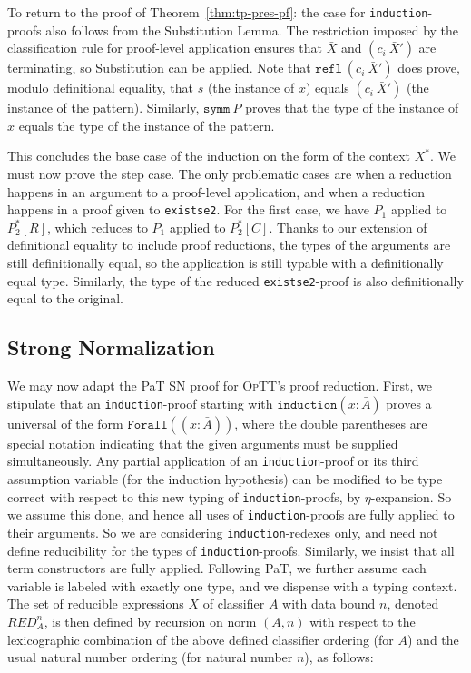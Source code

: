 \documentclass{fundam}
\newcommand{\optt}{\textsc{OpTT}}
\begin{document}
To return to the proof of Theorem~\ref{thm:tp-pres-pf}: the case for
\texttt{induction}-proofs also follows from the Substitution Lemma.
The restriction imposed by the classification rule for proof-level
application ensures that $\bar{X}$ and $(c_i\ \bar{X}')$ are
terminating, so Substitution can be applied.  Note that
$\texttt{refl}\ (c_i\ \bar{X}')$ does prove, modulo definitional
equality, that $s$ (the instance of $x$) equals $(c_i\ \bar{X}')$ (the
instance of the pattern).  Similarly, $\texttt{symm}\ P$ proves that
the type of the instance of $x$ equals the type of the instance of the
pattern.

This concludes the base case of the induction on the form of the
context $X^*$.  We must now prove the step case.  The only problematic
cases are when a reduction happens in an argument to a proof-level
application, and when a reduction happens in a proof given to
\texttt{existse2}.  For the first case, we have $P_1$ applied to
$P_2^*[R]$, which reduces to $P_1$ applied to $P_2^*[C]$.  Thanks to
our extension of definitional equality to include proof reductions,
the types of the arguments are still definitionally equal, so the
application is still typable with a definitionally equal type.
Similarly, the type of the reduced \texttt{existse2}-proof
is also definitionally equal to the original.

\subsection{Strong Normalization}

We may now adapt the PaT SN proof for \optt's proof reduction.  First,
we stipulate that an \texttt{induction}-proof starting with
$\texttt{induction}(\bar{x}:\bar{A})$ proves a universal of the form
$\texttt{Forall}((\bar{x}:\bar{A}))$, where the double parentheses are
special notation indicating that the given arguments must be supplied
simultaneously.  Any partial application of an
\texttt{induction}-proof or its third assumption variable (for the
induction hypothesis) can be modified to be type correct with respect
to this new typing of \texttt{induction}-proofs, by $\eta$-expansion.
So we assume this done, and hence all uses of
\texttt{induction}-proofs are fully applied to their arguments.  So we
are considering \texttt{induction}-redexes only, and need not define
reducibility for the types of \texttt{induction}-proofs.  Similarly,
we insist that all term constructors are fully applied.  Following
PaT, we further assume each variable is labeled with exactly one type,
and we dispense with a typing context.  The set of reducible
expressions $X$ of classifier $A$ with data bound $n$, denoted
$\textit{RED}^n_A$, is then defined by recursion on norm $(A,n)$ with
respect to the lexicographic combination of the above defined
classifier ordering (for $A$) and the usual natural number ordering
(for natural number $n$), as follows:
\end{document}

